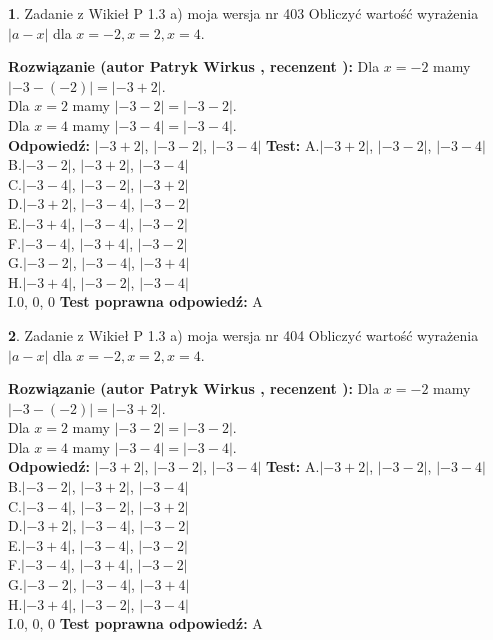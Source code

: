 \documentclass[12pt, a4paper]{article}
\theoremstyle{definition} %
\newtheorem{zad}{}
\newcommand{\zadStart}[1]{\begin{zad}#1\newline}
\newcommand{\zadStop}{\end{zad}}
\newcommand{\rozwStart}[2]{\noindent \textbf{Rozwiązanie (autor #1 , recenzent #2): }\newline}
\newcommand{\rozwStop}{\newline}
\newcommand{\odpStart}{\noindent \textbf{Odpowiedź:}\newline}
\newcommand{\odpStop}{\newline}
\newcommand{\testStart}{\noindent \textbf{Test:}\newline}
\newcommand{\testStop}{\newline}
\newcommand{\kluczStart}{\noindent \textbf{Test poprawna odpowiedź:}\newline}
\newcommand{\kluczStop}{\newline}
\begin{document}
\zadStart{Zadanie z Wikieł P 1.3 a) moja wersja nr 403}
Obliczyć wartość wyrażenia $|a - x|$ dla $x=-2,x=2,x=4$.
\zadStop
\rozwStart{Patryk Wirkus}{}
Dla $x = -2$ mamy $|-3 - (-2)| = |-3 + 2|$.\\
Dla $x = 2$ mamy $|-3 - 2| = |-3 - 2|$.\\
Dla $x = 4$ mamy $|-3 - 4| = |-3 - 4|$.\\
\rozwStop
\odpStart
$|-3 + 2|$, $|-3 - 2|$, $|-3 - 4|$
\odpStop
\testStart
A.$|-3 + 2|$, $|-3 - 2|$, $|-3 - 4|$\\
B.$|-3 - 2|$, $|-3 + 2|$, $|-3 - 4|$\\
C.$|-3 - 4|$, $|-3 - 2|$, $|-3 + 2|$\\
D.$|-3 + 2|$, $|-3 - 4|$, $|-3 - 2|$\\
E.$|-3 + 4|$, $|-3 - 4|$, $|-3 - 2|$\\
F.$|-3 - 4|$, $|-3 + 4|$, $|-3 - 2|$\\
G.$|-3 - 2|$, $|-3 - 4|$, $|-3 + 4|$\\
H.$|-3 + 4|$, $|-3 - 2|$, $|-3 - 4|$\\
I.$0$, $0$, $0$
\testStop
\kluczStart
A
\kluczStop



\zadStart{Zadanie z Wikieł P 1.3 a) moja wersja nr 404}
Obliczyć wartość wyrażenia $|a - x|$ dla $x=-2,x=2,x=4$.
\zadStop
\rozwStart{Patryk Wirkus}{}
Dla $x = -2$ mamy $|-3 - (-2)| = |-3 + 2|$.\\
Dla $x = 2$ mamy $|-3 - 2| = |-3 - 2|$.\\
Dla $x = 4$ mamy $|-3 - 4| = |-3 - 4|$.\\
\rozwStop
\odpStart
$|-3 + 2|$, $|-3 - 2|$, $|-3 - 4|$
\odpStop
\testStart
A.$|-3 + 2|$, $|-3 - 2|$, $|-3 - 4|$\\
B.$|-3 - 2|$, $|-3 + 2|$, $|-3 - 4|$\\
C.$|-3 - 4|$, $|-3 - 2|$, $|-3 + 2|$\\
D.$|-3 + 2|$, $|-3 - 4|$, $|-3 - 2|$\\
E.$|-3 + 4|$, $|-3 - 4|$, $|-3 - 2|$\\
F.$|-3 - 4|$, $|-3 + 4|$, $|-3 - 2|$\\
G.$|-3 - 2|$, $|-3 - 4|$, $|-3 + 4|$\\
H.$|-3 + 4|$, $|-3 - 2|$, $|-3 - 4|$\\
I.$0$, $0$, $0$
\testStop
\kluczStart
A
\kluczStop
\end{document}
